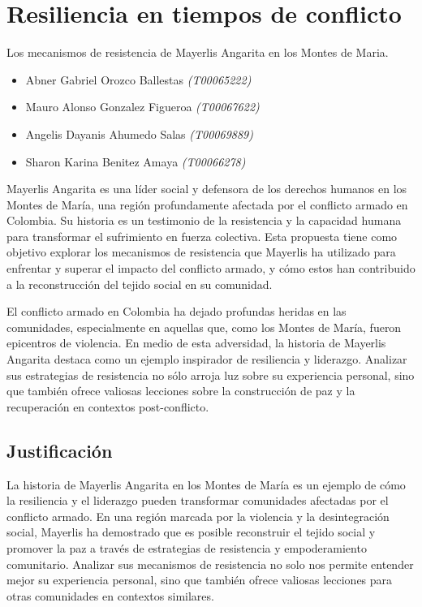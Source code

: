 \documentclass[letterpaper, 12pt]{report}
\begin{document}
\chapter*{Resiliencia en tiempos de conflicto}

\vspace*{-2cm}

\noindent Los mecanismos de resistencia de Mayerlis Angarita en los Montes de Maria.

\noindent\makebox[\linewidth]{\rule{\textwidth}{0.4pt}}

\begin{itemize}[label=$\triangleright$]
      \item Abner Gabriel Orozco Ballestas \textit{(T00065222)}
      \item Mauro Alonso Gonzalez Figueroa \textit{(T00067622)}
      \item Angelis Dayanis Ahumedo Salas \textit{(T00069889)}
      \item Sharon Karina Benitez Amaya \textit{(T00066278)}
\end{itemize}
Mayerlis Angarita es una líder social y defensora de los derechos humanos en
los Montes de María, una región profundamente afectada por el conflicto armado
en Colombia. Su historia es un testimonio de la resistencia y la capacidad
humana para transformar el sufrimiento en fuerza colectiva. Esta propuesta
tiene como objetivo explorar los mecanismos de resistencia que Mayerlis ha
utilizado para enfrentar y superar el impacto del conflicto armado, y cómo
estos han contribuido a la reconstrucción del tejido social en su comunidad.

El conflicto armado en Colombia ha dejado profundas heridas en las comunidades,
especialmente en aquellas que, como los Montes de María, fueron epicentros de
violencia. En medio de esta adversidad, la historia de Mayerlis Angarita
destaca como un ejemplo inspirador de resiliencia y liderazgo. Analizar sus
estrategias de resistencia no sólo arroja luz sobre su experiencia personal,
sino que también ofrece valiosas lecciones sobre la construcción de paz y la
recuperación en contextos post-conflicto.

\section*{Justificación}

La historia de Mayerlis Angarita en los Montes de María es un ejemplo de cómo
la resiliencia y el liderazgo pueden transformar comunidades afectadas por el
conflicto armado. En una región marcada por la violencia y la desintegración
social, Mayerlis ha demostrado que es posible reconstruir el tejido social y
promover la paz a través de estrategias de resistencia y empoderamiento
comunitario. Analizar sus mecanismos de resistencia no solo nos permite
entender mejor su experiencia personal, sino que también ofrece valiosas
lecciones para otras comunidades en contextos similares.
\end{document}
